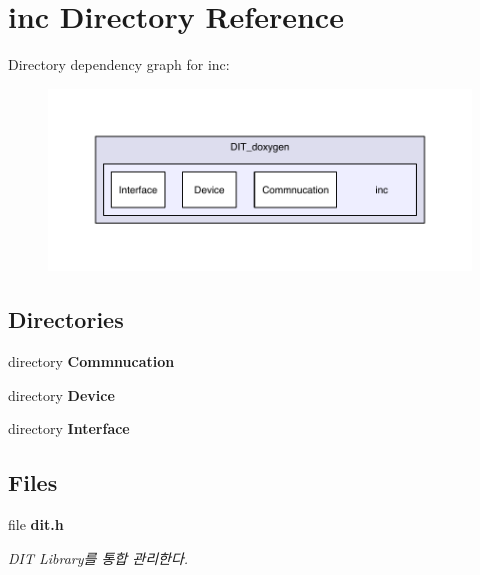 \section{inc Directory Reference}
\label{dir_d4c0d612476caabcfdb34a959dbd0d3d}
Directory dependency graph for inc\-:\nopagebreak
\begin{figure}[H]
\begin{center}
\leavevmode
\includegraphics[width=350pt]{dir_d4c0d612476caabcfdb34a959dbd0d3d_dep}
\end{center}
\end{figure}
\subsection*{Directories}
\begin{DoxyCompactItemize}
\item 
directory {\bf Commnucation}
\item 
directory {\bf Device}
\item 
directory {\bf Interface}
\end{DoxyCompactItemize}
\subsection*{Files}
\begin{DoxyCompactItemize}
\item 
file {\bf dit.\-h}
\begin{DoxyCompactList}\small\item\em D\-I\-T Library를 통합 관리한다. \end{DoxyCompactList}\end{DoxyCompactItemize}
